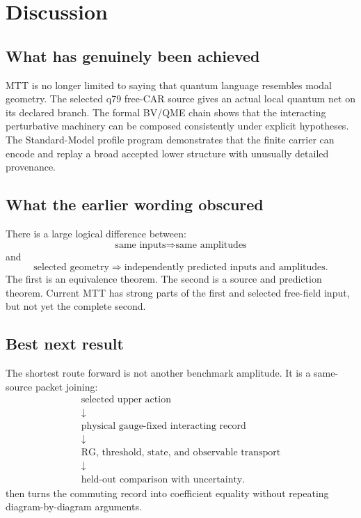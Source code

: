 \documentclass[11pt,a4paper]{article}
\numberwithin{equation}{section}
\theoremstyle{definition}
\theoremstyle{remark}
\begin{document}
\section{Discussion}

\subsection{What has genuinely been achieved}

MTT is no longer limited to saying that quantum language resembles modal
geometry.  The selected q79 free-CAR source gives an actual local quantum
net on its declared branch.  The formal BV/QME chain shows that the
interacting perturbative machinery can be composed consistently under
explicit hypotheses.  The Standard-Model profile program demonstrates
that the finite carrier can encode and replay a broad accepted lower
structure with unusually detailed provenance.

\subsection{What the earlier wording obscured}

There is a large logical difference between:
\[
\text{same inputs}\Longrightarrow\text{same amplitudes}
\]
and
\[
\text{selected geometry}\Longrightarrow
\text{independently predicted inputs and amplitudes}.
\]
The first is an equivalence theorem.  The second is a source and prediction
theorem.  Current MTT has strong parts of the first and selected free-field
input, but not yet the complete second.

\subsection{Best next result}

The shortest route forward is not another benchmark amplitude.  It is a
same-source packet joining:
\[
\begin{gathered}
\text{selected upper action}\\
\downarrow\\
\text{physical gauge-fixed interacting record}\\
\downarrow\\
\text{RG, threshold, state, and observable transport}\\
\downarrow\\
\text{held-out comparison with uncertainty}.
\end{gathered}
\]
 then turns the commuting record into coefficient
equality without repeating diagram-by-diagram arguments.
\end{document}
